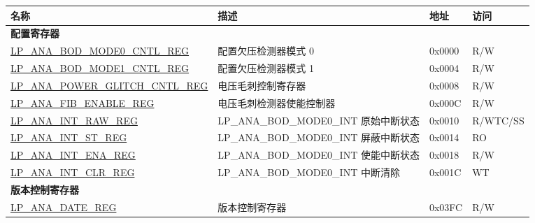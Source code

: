 \begin{longtable}{ | l | l | l | l | }
\hline\rowcolor{lightgray}
\textbf{名称} & \textbf{描述} &  \textbf{地址} & \textbf{访问} \\ \hline
\endhead
\multicolumn{4}{|l|}{\textbf{配置寄存器}} \\ \hline
\hyperref[regdesc:LPANABODMODE0CNTLREG]{LP\_ANA\_BOD\_MODE0\_CNTL\_REG} & 配置欠压检测器模式 0 & 0x0000 & R/W \\ \hline\hyperref[regdesc:LPANABODMODE1CNTLREG]{LP\_ANA\_BOD\_MODE1\_CNTL\_REG} &  配置欠压检测器模式 1 & 0x0004 & R/W \\  \hline\hyperref[regdesc:LPANAPOWERGLITCHCNTLREG]{LP\_ANA\_POWER\_GLITCH\_CNTL\_REG} & 电压毛刺控制寄存器 & 0x0008 & R/W \\  \hline\hyperref[regdesc:LPANAFIBENABLEREG]{LP\_ANA\_FIB\_ENABLE\_REG} & 电压毛刺检测器使能控制器 & 0x000C & R/W  \\ \hline\hyperref[regdesc:LPANAINTRAWREG]{LP\_ANA\_INT\_RAW\_REG} &  LP\_ANA\_BOD\_MODE0\_INT 原始中断状态 & 0x0010 & R/WTC/SS \\ \hline\hyperref[regdesc:LPANAINTSTREG]{LP\_ANA\_INT\_ST\_REG} & LP\_ANA\_BOD\_MODE0\_INT 屏蔽中断状态 & 0x0014 & RO \\ \hline\hyperref[regdesc:LPANAINTENAREG]{LP\_ANA\_INT\_ENA\_REG} & LP\_ANA\_BOD\_MODE0\_INT 使能中断状态 & 0x0018 & R/W \\ \hline\hyperref[regdesc:LPANAINTCLRREG]{LP\_ANA\_INT\_CLR\_REG} & LP\_ANA\_BOD\_MODE0\_INT 中断清除 & 0x001C & WT \\ \hline
\multicolumn{4}{|l|}{\textbf{版本控制寄存器}} \\ \hline
\hyperref[regdesc:LPANADATEREG]{LP\_ANA\_DATE\_REG} & 版本控制寄存器 & 0x03FC & R/W \\ \hline\end{longtable}